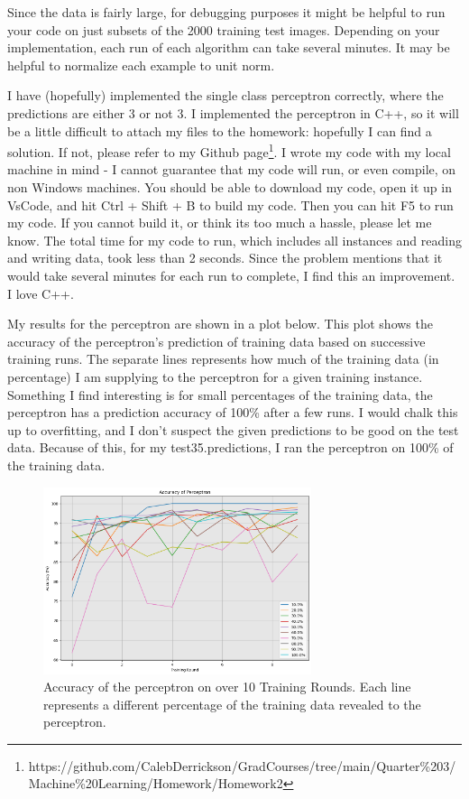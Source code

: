 \jump
Since the data is fairly large, for debugging purposes it might be helpful to run your code on just subsets of the 2000 training test images. Depending on your implementation, each run of each algorithm can take several minutes. It may be helpful to normalize each example to unit norm.

\partbreak
\begin{solution}

    I have (hopefully) implemented the single class perceptron correctly, where the predictions are either 3 or not 3. I implemented the perceptron in C++, so it will be a little difficult to attach my files to the homework: hopefully I can find a solution. If not, please refer to my Github page\footnote{https://github.com/CalebDerrickson/GradCourses/tree/main/Quarter\%203/Machine\%20Learning/Homework/Homework2}. I wrote my code with my local machine in mind - I cannot guarantee that my code will run, or even compile, on non Windows machines. You should be able to download my code, open it up in VsCode, and hit Ctrl + Shift + B to build my code. Then you can hit F5 to run my code. If you cannot build it, or think its too much a hassle, please let me know. The total time for my code to run, which includes all instances and reading and writing data, took less than 2 seconds. Since the problem mentions that it would take several minutes for each run to complete, I find this an improvement. I love C++.

    \jump
    My results for the perceptron are shown in a plot below. This plot shows the accuracy of the perceptron's prediction of training data based on successive training runs. The separate lines represents how much of the training data (in percentage) I am supplying to the perceptron for a given training instance. Something I find interesting is for small percentages of the training data, the perceptron has a prediction accuracy of 100\% after a few runs. I would chalk this up to overfitting, and I don't suspect the given predictions to be good on the test data. Because of this, for my test35.predictions, I ran the perceptron on 100\% of the training data. 
\end{solution}

\begin{figure}
    \centering
    \includegraphics[width = 0.7\textwidth]{accuracy.png}
    \caption{Accuracy of the perceptron on over 10 Training Rounds. Each line represents a different percentage of the training data revealed to the perceptron. }
    \label{fig:accuracy}
\end{figure}
